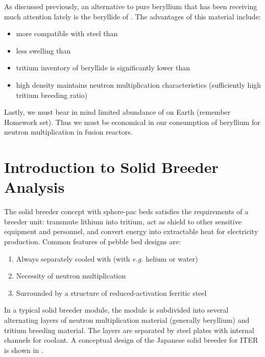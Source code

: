 \documentclass[11pt]{report} %
\begin{document}
As discussed previously, an alternative to pure beryllium that has been receiving much attention lately is the beryllide of . The advantages of this material include:\cite{Kawamura2003a}
\begin{itemize}
\item{more compatible with steel than }
\item{less swelling than }
\item{tritium inventory of beryllide is significantly lower than }
\item{high  density maintains neutron multiplication characteristics (sufficiently high tritium breeding ratio)}
\end{itemize}

Lastly, we must bear in mind limited abundance of  on Earth (remember Homework set). Thus we must be economical in our consumption of beryllium for neutron multiplication in fusion reactors.



























\chapter{Introduction to Solid Breeder Analysis}
The solid breeder concept with sphere-pac beds satisfies the requirements of a breeder unit: transmute lithium into tritium, act as shield to other sensitive equipment and personnel, and convert energy into extractable heat for electricity production. Common features of pebble bed designs are:
\begin{enumerate}
\item{Always separately cooled with (with \textit{e.g.} helium or water)}
\item{Necessity of neutron multiplication}
\item{Surrounded by a structure of reduced-activation ferritic steel}
\end{enumerate}
In a typical solid breeder module, the module is subdivided into several alternating layers of neutron multiplication material (generally beryllium) and tritium breeding material. The layers are separated by steel plates with internal channels for coolant. A conceptual design of the Japanese solid breeder for ITER is shown in .
\end{document}
